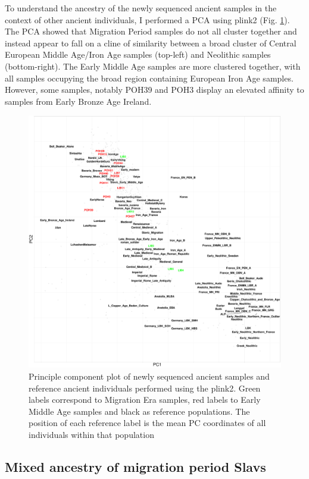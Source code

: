 To understand the ancestry of the newly sequenced ancient samples in the context of other ancient individuals, I performed a PCA using plink2 (Fig. \ref{fig:AllChr.plink_PCA}). The PCA showed that Migration Period samples do not all cluster together and instead appear to fall on a cline of similarity between a broad cluster of Central European Middle Age/Iron Age samples (top-left) and Neolithic samples (bottom-right). The Early Middle Age samples are more clustered together, with all samples occupying the broad region containing European Iron Age samples. However, some samples, notably POH39 and POH3 display an elevated affinity to samples from Early Bronze Age Ireland. 

\begin{figure}[htp]
    \centering
    \includegraphics[width=1.0\textwidth]{../images/chapter5/plink_pca.pdf}
    \caption{Principle component plot of newly sequenced ancient samples and reference ancient individuals performed using the plink2. Green labels correspond to Migration Era samples, red labels to Early Middle Age samples and black as reference populations. The position of each reference label is the mean PC coordinates of all individuals within that population}
    \label{fig:AllChr.plink_PCA}
\end{figure}


\subsection{Mixed ancestry of migration period Slavs}

